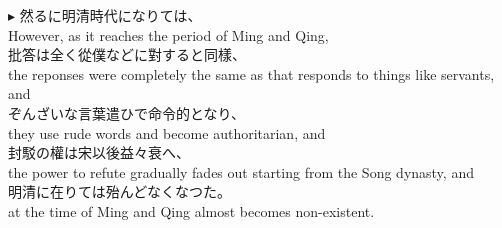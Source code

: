 \documentclass{ctexart}
\makeatletter
\newcommand*{\shifttext}[1]{%
  \settowidth{\@tempdima}{#1}%
  \hspace{-\@tempdima}#1%
}
\newcommand{\plabel}[1]{%
\shifttext{\textbf{#1}\quad}%
}
\makeatother
\begin{document}
\vspace{1em}
\plabel{$\blacktriangleright$}%
然るに明清時代になりては、\\
However, as it reaches the period of Ming and Qing,\\
批答は全く從僕などに對すると同樣、\\
the reponses were completely the same as that responds to things like servants, and\\
ぞんざいな言葉遣ひで命令的となり、\\
they use rude words and become authoritarian, and\\
封駁の權は宋以後益々衰へ、\\
the power to refute gradually fades out starting from the Song dynasty, and\\
明清に在りては殆んどなくなつた。\\
at the time of Ming and Qing almost becomes non-existent.
\end{document}
